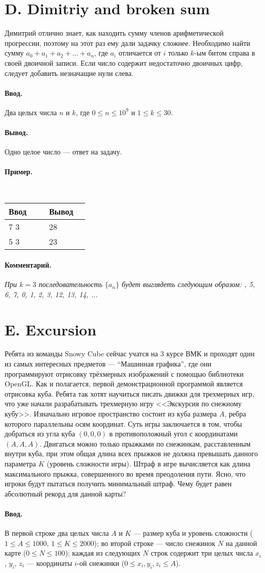 \documentclass[10pt, a5paper]{article}
\newcommand{\informat}[1]
{
	\paragraph{Ввод.\\} #1
}
\newcommand{\outformat}[1]
{
	\paragraph{Вывод.\\} #1
}
\newcommand{\examplee}[4]
{
	\paragraph{Пример.\\}
	{\tt
	\begin{tabular}{|p{0.4\linewidth}|p{0.4\linewidth}|}
	\hline
	Ввод 	& Вывод  	\\
	\hline
	#1 		& #2 		\\
	\hline
	#3		& #4		\\
	\hline
	\end{tabular}
	}
}
\newcommand{\excomm}[1]
{
	\paragraph{Комментарий. \\}
	\textit{#1}
}
\begin{document}
\section*{D. Dimitriy and broken sum}

Димитрий отлично знает, как находить сумму членов арифметической прогрессии, поэтому на этот раз ему дали задачку сложнее.
Необходимо найти сумму $a_0 + a_1 + a_2 + ... + a_n$, где $a_i$ отличается от $i$ только $k$-ым битом справа в своей двоичной записи. Если число содержит недостаточно двоичных цифр, следует добавить незначащие нули слева.

\informat{Два целых числа $n$ и $k$, где $0 \le n \le 10^9$ и $1 \le k \le 30$.}

\outformat{Одно целое число --- ответ на задачу.}

\examplee{7 3}{28}{5 3}{23}

\excomm{При $k = 3$ последовательность $\{a_n\}$ будет выглядеть следующим образом: \newline
4, 5, 6, 7, 0, 1, 2, 3, 12, 13, 14, ...}



\section*{E. Excursion}

Ребята из команды Snowy Cube сейчас учатся на 3 курсе ВМК и проходят один из самых интересных предметов --- “Машинная графика”, где они программируют отрисовку трёхмерных изображений с помощью библиотеки OpenGL. Как и полагается, первой демонстрационной программой является отрисовка куба. Ребята так хотят научиться писать движки для трехмерных игр, что уже начали разрабатывать трехмерную игру <<Экскурсия по снежному кубу>>. Изначально игровое пространство состоит из куба размера $A$, ребра которого параллельны осям координат. Суть игры заключается в том, чтобы добраться из угла куба $(0, 0, 0)$ в противоположный угол с координатами $(A, A, A)$. Двигаться можно только прыжками по снежинкам, расставленным внутри куба, при этом общая длина всех прыжков не должна превышать данного параметра $K$ (уровень сложности игры). Штраф в игре вычисляется как длина максимального прыжка, совершенного во время преодоления пути. Ясно, что игроки будут пытаться получить минимальный штраф. Чему будет равен абсолютный рекорд для данной карты? 

\informat{В первой строке два целых числа $A$ и $K$ --- размер куба и уровень сложности ($1 \le A \le 1000$, $1 \le K \le 2000$); \newline
во второй строке --- число снежинок $N$ на данной карте ($0 \le N \le 100$); \newline
каждая из следующих $N$ строк содержит три целых числа $x_i$, $y_i$, $z_i$ --- координаты $i$-ой снежинки ($0 \le x_i, y_i, z_i \le A$).}
\end{document}
